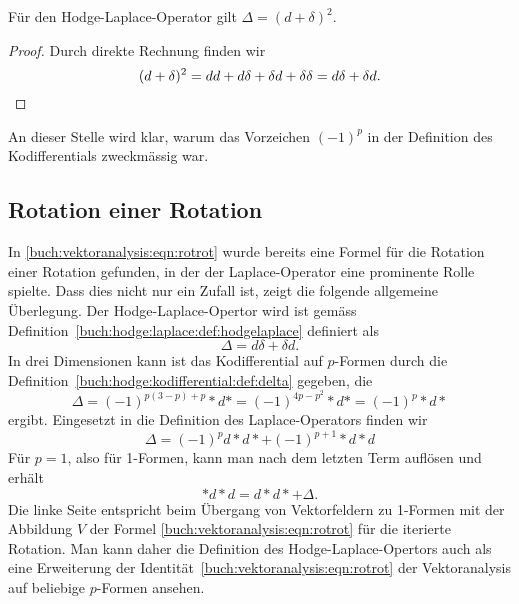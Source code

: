 \begin{satz}
Für den Hodge-Laplace-Operator gilt $\Delta = (d+\delta)^2$.
\end{satz}

\begin{proof}
Durch direkte Rechnung finden wir
\[
(d+\delta)^2
=
dd+d\delta+\delta d+\delta\delta
=
d\delta +\delta d.
\qedhere
\]
\end{proof}

An dieser Stelle wird klar, warum das Vorzeichen $(-1)^p$ in der
Definition des Kodifferentials zweckmässig war.

%
%
\subsection{Rotation einer Rotation}
In \eqref{buch:vektoranalysis:eqn:rotrot} wurde bereits eine Formel
für die Rotation einer Rotation gefunden, in der der Laplace-Operator
eine prominente Rolle spielte.
Dass dies nicht nur ein Zufall ist, zeigt die folgende allgemeine
Überlegung.
Der Hodge-Laplace-Opertor wird ist gemäss
Definition~\ref{buch:hodge:laplace:def:hodgelaplace}
definiert als 
\[
\Delta 
=
d\delta + \delta d.
\]
In drei Dimensionen kann ist das Kodifferential auf $p$-Formen durch
die Definition~\ref{buch:hodge:kodifferential:def:delta} gegeben,
die
\[
\Delta
=
(-1)^{p(3-p)+p}
{*}d{*}
=
(-1)^{4p-p^2}
{*}d{*}
=
(-1)^p
{*}d{*}
\]
ergibt.
Eingesetzt in die Definition des Laplace-Operators finden wir
\[
\Delta
=
(-1)^p
d{*}d{*}
+
(-1)^{p+1}
{*}d{*}d
\]
Für $p=1$, also für 1-Formen, kann man nach dem letzten Term auflösen
und erhält
\begin{equation}
{*}d{*}d
=
d{*}d{*}
+
\Delta.
\end{equation}
Die linke Seite entspricht beim Übergang von Vektorfeldern zu 1-Formen
mit der Abbildung $V$ der Formel \eqref{buch:vektoranalysis:eqn:rotrot}
für die iterierte Rotation.
Man kann daher die Definition des Hodge-Laplace-Opertors auch als
eine Erweiterung der Identität~\eqref{buch:vektoranalysis:eqn:rotrot}
der Vektoranalysis auf beliebige $p$-Formen ansehen.




